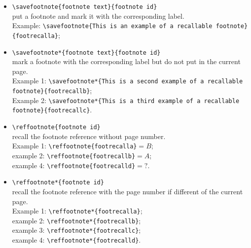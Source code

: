 \documentclass[book]{upmethodology-document}
\begin{document}
\begin{itemize}
\item \texttt{{\textbackslash}savefootnote\{footnote text\}\{footnote id\}} \\
	put a footnote and mark it with the corresponding label. \\
	Example: \texttt{{\textbackslash}savefootnote\{This is an example of a recallable footnote\}\{footrecalla\}};
\item \texttt{{\textbackslash}savefootnote*\{footnote text\}\{footnote id\}} \\
	mark a footnote with the corresponding label but do not put in the current page. \\
	Example 1: \texttt{{\textbackslash}savefootnote*\{This is a second example of a recallable footnote\}\{footrecallb\}}; \\
	Example 2: \texttt{{\textbackslash}savefootnote*\{This is a third example of a recallable footnote\}\{footrecallc\}}.
\item \texttt{{\textbackslash}reffootnote\{footnote id\}} \\
	recall the footnote reference without page number. \\
	Example 1: \texttt{{\textbackslash}reffootnote\{footrecalla\}}$=B$; \\
	example 2: \texttt{{\textbackslash}reffootnote\{footrecallb\}}$=A$; \\
	example 4: \texttt{{\textbackslash}reffootnote\{footrecalld\}}$=?$.
\item \texttt{{\textbackslash}reffootnote*\{footnote id\}} \\
	recall the footnote reference with the page number if different of the current page. \\
	Example 1: \texttt{{\textbackslash}reffootnote*\{footrecalla\}}; \\
	example 2: \texttt{{\textbackslash}reffootnote*\{footrecallb\}}; \\
	example 3: \texttt{{\textbackslash}reffootnote*\{footrecallc\}}; \\
	example 4: \texttt{{\textbackslash}reffootnote*\{footrecalld\}}.
\end{itemize}
\end{document}
